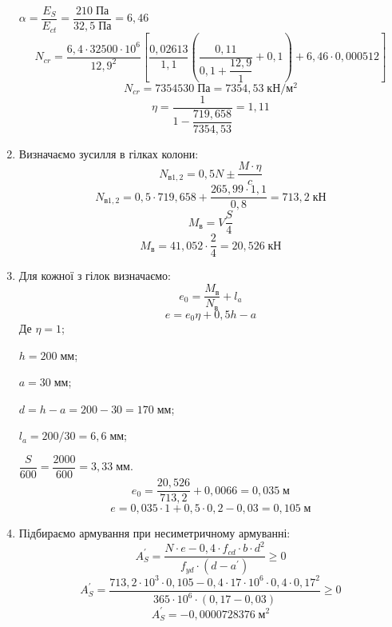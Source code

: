 \documentclass[a4paper,14pt]{article}
\begin{document}
\begin{enumerate}
        $\alpha = \dfrac{E_S}{E_{ct}} = \dfrac{210\;\textit{Па}}{32,5\;\textit{Па}} = 6,46$
        $$N_{cr} = \dfrac{6,4 \cdot 32500 \cdot 10^6}{12,9^2} \left[\dfrac{0,02613}{1,1} \left(\dfrac{0,11}{0,1 + \dfrac{12,9}{1}} + 0,1\right) + 6,46 \cdot 0,000512\right]$$
        $$N_{cr} = 7354530\;\textit{Па} = 7354,53\;\textit{кН}/\textit{м}^2$$
        $$\eta = \dfrac{1}{1 - \dfrac{719,658}{7354,53}} = 1,11$$
    \item Визначаємо зусилля в гілках колони:
        \begin{equation}\label{eq:23}
            N_{\textit{в}1,2} = 0,5N \pm \dfrac{M \cdot \eta}{c}
        \end{equation}
        $$N_{\textit{в}1,2} = 0,5\cdot 719,658 + \dfrac{265,99 \cdot 1,1}{0,8} = 713,2\;\textit{кН}$$
        \begin{equation}\label{eq:24}
            M_\textit{в} = V \dfrac{S}{4}
        \end{equation}
        $$M_\textit{в} = 41,052 \cdot \dfrac{2}{4} = 20,526\;\textit{кН}$$
    \item Для кожної з гілок визначаємо:
        \begin{equation}\label{eq:25}
            e_0 = \dfrac{M_\textit{в}}{N_\textit{в}} + l_a
        \end{equation}
        \begin{equation}\label{eq:26}
            e = e_0\eta +  0,5h - a
        \end{equation}
        Де $\eta = 1$;

        $h = 200\;\textit{мм}$;

        $a = 30\;\textit{мм}$;

        $d = h - a = 200 - 30 = 170\;\textit{мм}$;

        $l_a = 200 / 30 = 6,6\;\textit{мм}$;

        $\dfrac{S}{600} = \dfrac{2000}{600} = 3,33\;\textit{мм}$.
        $$e_0 = \dfrac{20,526}{713,2} + 0,0066 = 0,035\;\textit{м}$$
        $$e = 0,035 \cdot 1 +  0,5 \cdot 0,2 - 0,03 = 0,105\;\textit{м}$$
    \item Підбираємо армування при несиметричному армуванні:
        \begin{equation}\label{eq:27}
            A_S^\prime = \dfrac{N \cdot e - 0,4 \cdot f_{cd} \cdot b \cdot d^2}{f_{yd} \cdot (d - a^\prime)} \geqslant 0
        \end{equation}
        $$A_S^\prime = \dfrac{713,2 \cdot 10^3 \cdot 0,105 - 0,4 \cdot 17 \cdot 10^6 \cdot 0,4 \cdot 0,17^2}{365 \cdot 10^6 \cdot (0,17 - 0,03)} \geqslant 0$$
        $$A_S^\prime = -0,0000728376\;\textit{м}^2$$


\end{enumerate}
\end{document}
